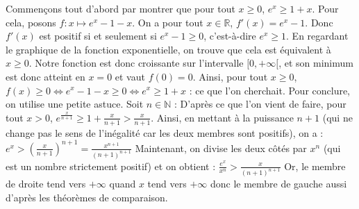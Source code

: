 	\begin{demonstration}
		Commençons tout d'abord par montrer que pour tout $x \geq 0$, $e^x \geq 1 + x$. Pour cela, posons $f : x \mapsto e^x - 1 - x$. On a pour tout $x \in \mathbb{R}$, $f'(x) = e^x - 1$. Donc $f'(x)$ est positif si et seulement si $e^x - 1 \geq 0$, c'est-à-dire $e^x \geq 1$.
		\newpar
		En regardant le graphique de la fonction exponentielle, on trouve que cela est équivalent à $x \geq 0$.
		\newpar
		Notre fonction est donc croissante sur l'intervalle $[0, +\infty[$, et son minimum est donc atteint en $x = 0$ et vaut $f(0) = 0$. Ainsi, pour tout $x \geq 0$, $f(x) \geq 0 \iff e^x - 1 - x \geq 0 \iff e^x \geq 1 + x$ : ce que l'on cherchait.
		\newpar
		Pour conclure, on utilise une petite astuce. Soit $n \in \mathbb{N}$ :
		\newpar
		D'après ce que l'on vient de faire, pour tout $x > 0$, $e^{\frac{x}{n+1}} \geq 1 + \frac{x}{n+1} > \frac{x}{n+1}$. Ainsi, en mettant à la puissance $n + 1$ (qui ne change pas le sens de l'inégalité car les deux membres sont positifs), on a :
		\newpar
		$e^x > (\frac{x}{n+1})^{n+1} = \frac{x^{n+1}}{(n+1)^{n+1}}$
		Maintenant, on divise les deux côtés par $x^n$ (qui est un nombre strictement positif) et on obtient :
		\newpar
		$\frac{e^x}{x^n} > \frac{x}{(n+1)^{n+1}}$
		\newpar
		Or, le membre de droite tend vers $+\infty$ quand $x$ tend vers $+\infty$ donc le membre de gauche aussi d'après les théorèmes de comparaison.
	\end{demonstration}

